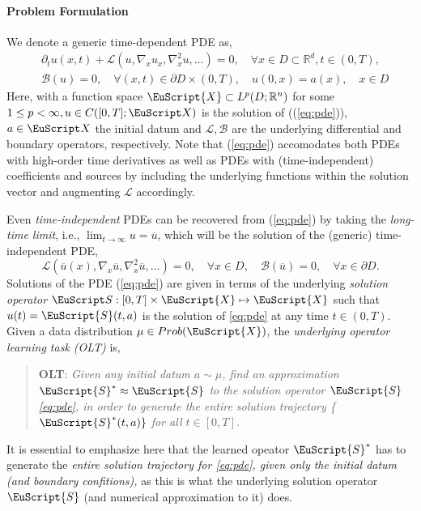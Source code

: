 \documentclass[reqno,10pt]{amsart}
\theoremstyle{plain}
\theoremstyle{definition}
\newcommand{\bb}[1]{\mathbb{#1}}
\newcommand{\cal}[1]{\mathcal{#1}}
\newcommand{\eus}[1]{\EuScript{#1}}
\begin{document}
\paragraph{\bf Problem Formulation} We denote a generic time-dependent PDE as,
\begin{equation}\label{eq:pde}
    \begin{split}
        &\partial_t u(x,t) + \cal L(u, \nabla_x u_x, \nabla^2_x u, \dots) = 0, \quad \forall x \in D \subset \bb R^d, t \in (0,T), \\
        &\cal B(u) = 0, \quad \forall(x,t) \in \partial D \times (0,T), \quad u(0,x) = a(x), \quad x \in D
    \end{split}
\end{equation}
Here, with a function space $\EuScript{X} \subset L^p(D;\bb R^n)$ for some $1 \leq p < \infty, u \in C([0,T];\EuScript X)$ is the solution of ((\ref{eq:pde})), $a \in \EuScript X$ the initial datum and $\cal L, \cal B$ are the underlying differential and boundary operators, respectively. Note that (\ref{eq:pde}) accomodates both PDEs with high-order time derivatives as well as  PDEs with (time-independent) coefficients and sources by including the underlying functions within the solution vector and augmenting $\cal L$ accordingly.

\noindent Even {\it time-independent} PDEs can be recovered from (\ref{eq:pde}) by taking the {\it long-time limit}, i.e., $\lim_{t \to\infty} u = \overline{u}$, which will be the solution of the (generic) time-independent PDE,
\begin{equation}
    \cal L(\overline{u}(x), \nabla_x \overline{u}, \nabla^2_x\overline{u}, \dots) = 0, \quad \forall x \in D, \quad \cal B(\overline{u}) = 0, \quad \forall x \in \partial D.
\end{equation}
Solutions of the PDE (\ref{eq:pde}) are given in terms of the underlying {\it solution operator} $\EuScript S: [0,T] \times \eus X \mapsto \eus X$ such that $u(t) = \eus S(t,a)$ is the solution of \ref{eq:pde} at any time $t \in (0,T)$. Given a data distribution $\mu \in Prob(\eus X)$, the {\it underlying operator learning task (OLT)} is,

\begin{quote}
    {\bf OLT}: {\it Given any initial datum $a \sim \mu$, find an approximation $\eus S^* \approx \eus S$ to the solution operator $\eus S$ \ref{eq:pde}, in order to generate the entire solution trajectory \{$\eus S^*(t,a)\}$ for all $t\in [0,T]$.}
\end{quote}
It is essential to emphasize here that the learned opeator $\eus S^*$ has to generate the {\it entire solution trajectory for \ref{eq:pde}, given only the initial datum (and boundary confitions),} as this is what the underlying solution operator $\eus S$ (and numerical approximation to it) does.
\end{document}
